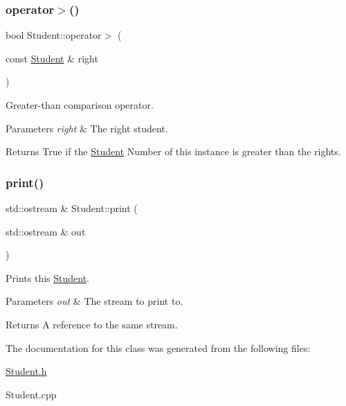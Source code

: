 \subsubsection{\texorpdfstring{operator$>$()}{operator>()}}
{\footnotesize\ttfamily bool Student\+::operator$>$ (\begin{DoxyParamCaption}\item[{const \hyperlink{class_student}{Student} \&}]{right }\end{DoxyParamCaption})}



Greater-\/than comparison operator. 


\begin{DoxyParams}{Parameters}
{\em right} & The right student.\\
\hline
\end{DoxyParams}
\begin{DoxyReturn}{Returns}
True if the \hyperlink{class_student}{Student} Number of this instance is greater than the right\textquotesingle{}s. 
\end{DoxyReturn}
\mbox{\label{class_student_a4fa6f3748a513137a8bb9728f579978c}} 
\subsubsection{\texorpdfstring{print()}{print()}}
{\footnotesize\ttfamily std\+::ostream \& Student\+::print (\begin{DoxyParamCaption}\item[{std\+::ostream \&}]{out }\end{DoxyParamCaption})}



Prints this \hyperlink{class_student}{Student}. 


\begin{DoxyParams}{Parameters}
{\em out} & The stream to print to.\\
\hline
\end{DoxyParams}
\begin{DoxyReturn}{Returns}
A reference to the same stream. 
\end{DoxyReturn}


The documentation for this class was generated from the following files\+:\begin{DoxyCompactItemize}
\item 
\hyperlink{_student_8h}{Student.\+h}\item 
Student.\+cpp\end{DoxyCompactItemize}
